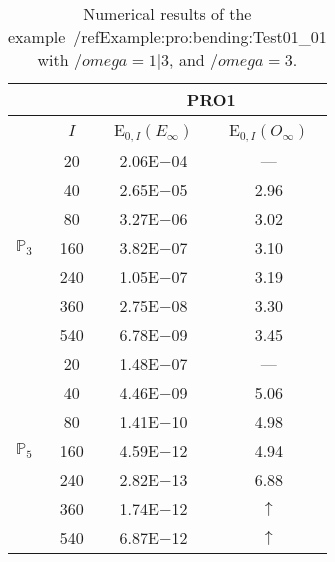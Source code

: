 \begin{table}[H]
\caption{Numerical results of the example~/ref{Example:pro:bending:Test01_01} with $/omega=1|3$, and $/omega=3$.}
\setlength{\tabcolsep}{5pt}
\centering
\begin{tabular}{@{}l c c c@{}}
\toprule
 &  & \multicolumn{2}{c}{PRO1}\\
\midrule
 & $I$ & E$_{0,I}(E_{\infty})$ & E$_{0,I}(O_{\infty})$\\
\midrule
\multirow{7}{*}{$\mathbb{P}_{3}$}
 & 20 & 2.06E$-$04 & ---\\
 & 40 & 2.65E$-$05 & 2.96\\
 & 80 & 3.27E$-$06 & 3.02\\
 & 160 & 3.82E$-$07 & 3.10\\
 & 240 & 1.05E$-$07 & 3.19\\
 & 360 & 2.75E$-$08 & 3.30\\
 & 540 & 6.78E$-$09 & 3.45\\
\midrule
\multirow{7}{*}{$\mathbb{P}_{5}$}
 & 20 & 1.48E$-$07 & ---\\
 & 40 & 4.46E$-$09 & 5.06\\
 & 80 & 1.41E$-$10 & 4.98\\
 & 160 & 4.59E$-$12 & 4.94\\
 & 240 & 2.82E$-$13 & 6.88\\
 & 360 & 1.74E$-$12 & $\uparrow$\\
 & 540 & 6.87E$-$12 & $\uparrow$\\
\bottomrule
\end{tabular}
\label{Table:pRO:test_01_01_test7_pro2}
\end{table}
